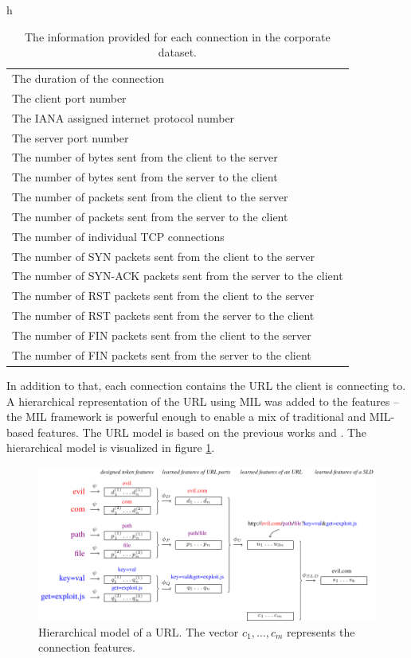 \begin{table}{h}
  \centering
  \begin{tabular}{l}
    \toprule
    The duration of the connection \\
    The client port number \\
    The IANA assigned internet protocol number \\
    The server port number \\
    The number of bytes sent from the client to the server \\
    The number of bytes sent from the server to the client \\
    The number of packets sent from the client to the server \\
    The number of packets sent from the server to the client \\
    The number of individual TCP connections \\
    The number of SYN packets sent from the client to the server \\
    The number of SYN-ACK packets sent from the server to the client \\
    The number of RST packets sent from the client to the server \\
    The number of RST packets sent from the server to the client \\
    The number of FIN packets sent from the client to the server \\
    The number of FIN packets sent from the server to the client \\
    \bottomrule
  \end{tabular}
  \caption{The information provided for each connection in the corporate dataset.}\label{tab:cisco-features}
\end{table}

In addition to that, each connection contains the URL the client is connecting to. A hierarchical representation of the URL using MIL was added to the features -- the MIL framework is powerful enough to enable a mix of traditional and MIL-based features. The URL model is based on the previous works \cite{dedic_hierarchicke_2017} and \cite{pevny_nested_2020}. The hierarchical model is visualized in figure \ref{fig:URL-model}.


\begin{figure}[H]
  \centering
  \includegraphics[width=\textwidth]{images/URL-model/URL-model.pdf}
  \caption{Hierarchical model of a URL. The vector \( c_1, \dots, c_m \) represents the connection features.}\label{fig:URL-model}
\end{figure}

